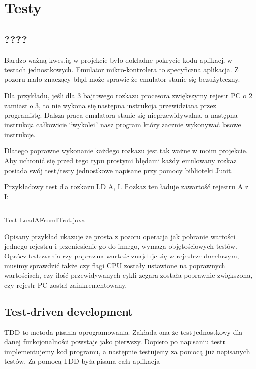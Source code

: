 \chapter{Testy}
		
	\section{????}
	Bardzo ważną kwestią w projekcie było dokładne pokrycie kodu aplikacji w testach jednostkowych. Emulator mikro-kontrolera to specyficzna aplikacja. Z pozoru mało znaczący błąd może sprawić że emulator stanie się bezużyteczny. 
	
	Dla przykładu, jeśli dla 3 bajtowego rozkazu procesora zwiększymy rejestr PC o 2 zamiast o 3, to nie wykona się następna instrukcja przewidziana przez programistę. Dalsza praca emulatora stanie się nieprzewidywalna, a następna instrukcja całkowicie “wykolei” nasz program który zacznie wykonywać losowe instrukcje. 
	
	Dlatego poprawne wykonanie każdego rozkazu jest tak ważne w moim projekcie. Aby uchronić się przed tego typu prostymi błędami każdy emulowany rozkaz posiada swój test/testy jednostkowe napisane przy pomocy biblioteki Junit. 
	
	Przykładowy test dla rozkazu LD A, I. Rozkaz ten ładuje zawartość rejestru A z I:
	
	\begin{listing}[h]
		\inputminted{Java}{listings/exampleTest.java}
		\caption{Test LoadAFromITest.java}
		\label{listing:LoadAFromITest}
	\end{listing}
	
	Opisany przykład ukazuje że prosta z pozoru operacja jak pobranie wartości jednego rejestru i przeniesienie go do innego, wymaga objętościowych testów. Oprócz testowania czy poprawna wartość znajduje się w rejestrze docelowym, musimy sprawdzić także czy flagi CPU zostały ustawione na poprawnych wartościach, czy ilość przewidywanych cykli zegara została poprawnie zwiększona, czy rejestr PC został zainkrementowany. 
	
	\section{Test-driven development}
	TDD to metoda pisania oprogramowania. Zakłada ona że test jednostkowy dla danej funkcjonalności powstaje jako pierwszy. Dopiero po napisaniu testu implementujemy kod programu, a następnie testujemy za pomocą już napisanych testów. Za pomocą TDD była pisana cała aplikacja